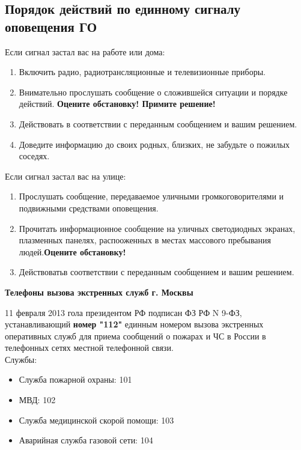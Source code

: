 \documentclass[a4paper, 12pt]{article}
\theoremstyle{definition}
\begin{document}
        \subsection{Порядок действий по единному сигналу оповещения ГО}
        Если сигнал застал вас на работе или дома:
        \begin{enumerate}
            \item Включить радио, радиотрансляционные и телевизионные приборы.
            \item Внимательно прослушать сообщение о сложившейся ситуации и порядке действий. \textbf{Оцените обстановку! Примите решение!} 
            \item Действовать в соответствии с переданным сообщением и вашим решением.
            \item Доведите информацию до своих родных, близких, не забудьте о пожилых соседях.
        \end{enumerate}
        Если сигнал застал вас на улице:
        \begin{enumerate}
            \item Прослушать сообщение, передаваемое уличными громкоговорителями и подвижными средствами оповещения.
            \item Прочитать информационное сообщение на уличных светодиодных экранах, плазменных панелях, распооженных в местах массового пребывания людей.\textbf{Оцените обстановку!}
            \item Действоватьв соответствии с переданным сообщением и вашим решением. 
        \end{enumerate}
        \begin{center}
            \textbf{Телефоны вызова экстренных служб г. Москвы} 
        \end{center}
        11 февраля 2013 гола президентом РФ подписан ФЗ РФ N 9-ФЗ, устанавливающий \textbf{номер "112"} единным номером вызова экстренных оперативных служб для приема сообщений о пожарах и ЧС в России в телефонных сетях местной телефонной связи.\\
        Службы:
        \begin{itemize}
            \item Служба пожарной охраны: 101
            \item МВД: 102
            \item Служба медицинской скорой помощи: 103
            \item Аварийная служба газовой сети: 104
        \end{itemize}
\end{document}
